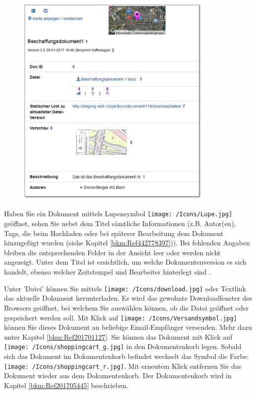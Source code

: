 \begin{figure}
\vspace{-15pt}
\includegraphics[height=105mm]{../chapters/11_Dokumentenablage/pictures/11-2-5_Dokumentenansicht.jpg}
\end{figure}

Haben Sie ein Dokument mittels Lupensymbol \texttt{[image: /Icons/Lupe.jpg]} geöffnet, sehen Sie nebst dem Titel  sämtliche Informationen (z.B. Autor(en), Tags, die beim Hochladen oder bei späterer Bearbeitung dem Dokument hinzugefügt wurden (siehe Kapitel \ref{bkm:Ref442778397})). Bei fehlenden Angaben bleiben die entsprechenden Felder in der Ansicht leer oder werden nicht angezeigt. Unter dem Titel ist ersichtlich, um welche Dokumentenversion es sich handelt, ebenso welcher Zeitstempel und Bearbeiter hinterlegt sind . \newline

Unter 'Datei' können Sie mittels \texttt{[image: /Icons/download.jpg]} oder Textlink  das aktuelle Dokument herunterladen. Es wird das gewohnte Downloadfenster des Browsers geöffnet, bei welchem Sie auswählen können, ob die Datei geöffnet oder gespeichert werden soll. Mit Klick auf \texttt{[image: /Icons/Versandsymbol.jpg]}  können Sie dieses Dokument an beliebige Email-Empfänger versenden. Mehr dazu unter Kapitel \ref{bkm:Ref201701127}. Sie können das Dokument mit Klick auf \texttt{[image: /Icons/shoppingcart\_g.jpg]}  in den Dokumentenkorb legen. Sobald sich das Dokument im Dokumentenkorb befindet wechselt das Symbol die Farbe: \texttt{[image: /Icons/shoppingcart\_r.jpg]}. Mit erneutem Klick entfernen Sie das Dokument wieder aus dem Dokumentenkorb. Der Dokumentenkorb wird in Kapitel \ref{bkm:Ref201705445} beschrieben. \newline

